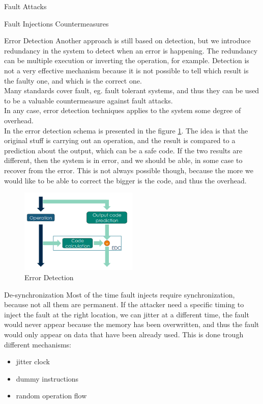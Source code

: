 \begin{chapter}{Fault Attacks}
\begin{section}{Fault Injections Countermeasures}
    \begin{subsection}{Error Detection}
      Another approach is still based on detection, but we introduce redundancy in the system to
      detect when an error is happening. The redundancy can be multiple execution or inverting the
      operation, for example. Detection is not a very effective mechanism because it is not possible
      to tell which result is the faulty one, and which is the correct one.\\
      Many standards cover fault, eg. fault tolerant systems, and thus they can be used to be a
      valuable countermeasure against fault attacks.\\ 
      In any case, error detection techniques applies to the system some degree of overhead.\\
      In the error detection schema is presented in the figure \ref{fig:error_detection}. The idea
      is that the original stuff is carrying out an operation, and the result is compared to a
      prediction about the output, which can be a safe code. If the two results are different, then
      the system is in error, and we should be able, in some case to recover from the error. This is
      not always possible though, because the more we would like to be able to correct the bigger is
      the code, and thus the overhead.
      \begin{figure}[H]
        \centering
        \includegraphics[width=0.5\textwidth]{img/hardware/error detection.png}
        \caption{Error Detection}
        \label{fig:error_detection}
      \end{figure}
      \end{subsection}

      \begin{subsection}{De-synchronization}
        Most of the time fault injects require synchronization, because not all them are permanent.
        If the attacker need a specific timing to inject the fault at the right location, we can
        jitter at a different time, the fault would never appear because the memory has been
        overwritten, and thus the fault would only appear on data that have been already used.
        This is done trough different mechanisms:
        \begin{itemize}
          \item jitter clock
          \item dummy instructions
          \item random operation flow
        \end{itemize}


\end{subsection}
\end{section}
\end{chapter}
